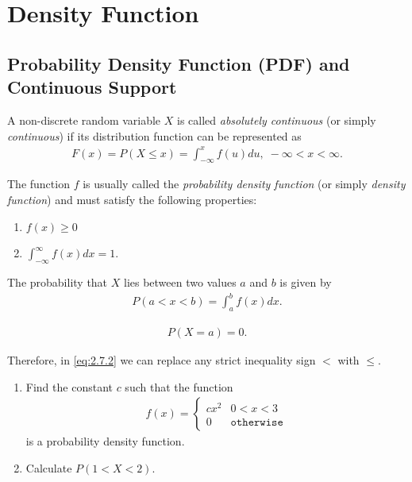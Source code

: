 \section{Density Function}
\subsection{Probability Density Function (PDF) and Continuous Support}

	A non-discrete random variable $X$ is called \emph{absolutely continuous} (or simply \emph{continuous}) if its distribution function can be represented as
	\begin{align}
		 \label{eq:2.7.1}
		 F(x)=P(X \leq x)=\int_{-\infty}^{x} f(u)du, \; -\infty < x <\infty.
	\end{align}

	The function $f$ is usually called the \emph{probability density function} (or simply \emph{density function}) and must satisfy the following properties:
	\begin{enumerate}
		\item $f(x)\geq 0 $
		\item $\displaystyle \int_{-\infty}^{\infty}f(x)dx=1.$
	\end{enumerate}

	The probability that $X$ lies between two values $a$ and $b$ is given by
	\begin{align}
		\label{eq:2.7.2}
		P(a < x <b)=\int_{a}^{b}f(x)dx.
	\end{align}

	\begin{align}
		\label{eq:2.7.3}
		P(X=a)=0.
	\end{align}

Therefore, in \eqref{eq:2.7.2} we can replace any strict inequality sign $<$ with $\leq.$

	\begin{ejemplo}
		\label{exmp:2.7.1}
		\begin{enumerate}
			\item Find the constant $c$ such that the function
			\begin{align}
				f(x)=
				\begin{cases}
					cx^{2} & 0 < x < 3 \\
					0 & \texttt{otherwise}
				\end{cases}
			\end{align}
			is a probability density function. 
			\item Calculate $P(1 < X < 2).$
		\end{enumerate}
	\end{ejemplo}

